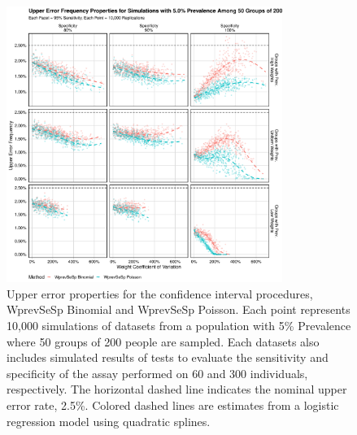 \documentclass[AMA,STIX1COL]{WileyNJD-v2}
\begin{document}
\begin{figure}
\centering
\includegraphics[width=0.8\textwidth]{figures/imperfect_upper_error_frequency_50_groups_0_05_prev.pdf}
\caption{Upper error properties for the confidence interval procedures, WprevSeSp Binomial and WprevSeSp Poisson.
Each point represents 10,000 simulations of datasets from a population with 5\% Prevalence where 50 groups of 200 people are sampled.
Each datasets also includes simulated results of tests to evaluate the sensitivity and specificity of the assay performed on 60 and 300 individuals, respectively.
The horizontal dashed line indicates the nominal upper error rate, 2.5\%.
Colored dashed lines are estimates from a logistic regression model using quadratic splines.}
\label{fig:imperfect_upper_error_frequency_50_groups_0_05_prev}
\end{figure}
\end{document}
